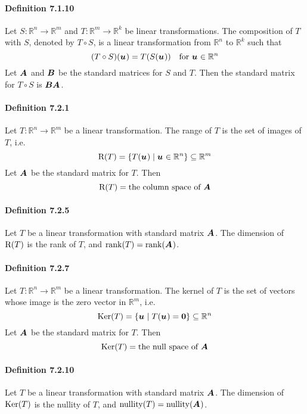 \documentclass[a4paper]{article}
\newcommand{\R}{\mathbb{R}}
\begin{document}
\begin{multicols*}{3}
    \paragraph{Definition 7.1.10} Let $S: \R^n \rightarrow \R^m$ and $T: \R^m \rightarrow \R^k$ be linear transformations. The composition of $T$ with $S$, denoted by $T \circ S$, is a linear transformation from $\R^n$ to $\R^k$ such that
      \begin{equation*}
        (T \circ S)(\u) = T(S(\u)) \quad \text{for } \u \in \R^n
      \end{equation*}
      Let $\boldsymbol{A_{}}$ and $\boldsymbol{B}$ be the standard matrices for $S$ and $T$. Then the standard matrix for $T \circ S$ is $\boldsymbol{B}\boldsymbol{A_{}}$.
    \paragraph{Definition 7.2.1} Let $T: \R^n \rightarrow \R^m$ be a linear transformation. The range of $T$ is the set of images of $T$, i.e.
      \begin{equation*}
        \Range(T) = \{ T(\u) \;\vert\; \u \in \R^n \} \subseteq \R^m
      \end{equation*}
      Let $\boldsymbol{A_{}}$ be the standard matrix for $T$. Then
      \begin{equation*}
        \mathrm{R}(T) = \text{the column space of } \boldsymbol{A_{}}
      \end{equation*}
    \paragraph{Definition 7.2.5} Let $T$ be a linear transformation with standard matrix $\boldsymbol{A_{}}$. The dimension of $\mathrm{R}(T)$ is the rank of $T$, and $\mathrm{rank}(T) = \mathrm{rank}(\boldsymbol{A_{}})$.
    \paragraph{Definition 7.2.7} Let $T: \R^n \rightarrow \R^m$ be a linear transformation. The kernel of $T$ is the set of vectors whose image is the zero vector in $\R^m$, i.e.
      \begin{equation*}
        \Kernel(T) = \{ \u \;\vert\; T(\u) = \vz \} \subseteq \R^n
      \end{equation*}
      Let $\boldsymbol{A_{}}$ be the standard matrix for $T$. Then
      \begin{equation*}
        \mathrm{Ker}(T) = \text{the null space of } \boldsymbol{A_{}}
      \end{equation*}
    \paragraph{Definition 7.2.10} Let $T$ be a linear transformation with standard matrix $\boldsymbol{A_{}}$. The dimension of $\mathrm{Ker}(T)$ is the nullity of $T$, and $\mathrm{nullity}(T) = \mathrm{nullity}(\boldsymbol{A_{}})$.

\end{multicols*}
\end{document}
